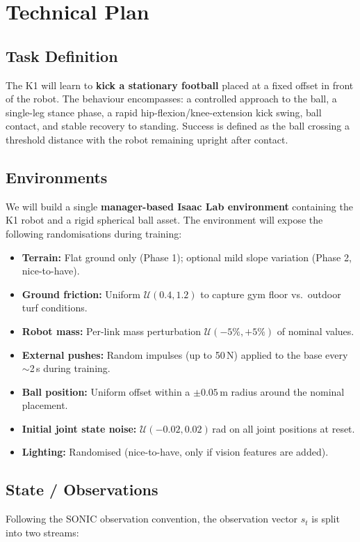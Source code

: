 \documentclass[12pt]{article}
\begin{document}
\section{Technical Plan}

\subsection{Task Definition}
The K1 will learn to \textbf{kick a stationary football} placed at a fixed offset in front of the robot. The behaviour encompasses: a controlled approach to the ball, a single-leg stance phase, a rapid hip-flexion/knee-extension kick swing, ball contact, and stable recovery to standing. Success is defined as the ball crossing a threshold distance with the robot remaining upright after contact.

\subsection{Environments}
We will build a single \textbf{manager-based Isaac Lab environment} containing the K1 robot and a rigid spherical ball asset. The environment will expose the following randomisations during training:

\begin{itemize}[noitemsep]
    \item \textbf{Terrain:} Flat ground only (Phase 1); optional mild slope variation (Phase 2, nice-to-have).
    \item \textbf{Ground friction:} Uniform $\mathcal{U}(0.4, 1.2)$ to capture gym floor vs.\ outdoor turf conditions.
    \item \textbf{Robot mass:} Per-link mass perturbation $\mathcal{U}(-5\%,+5\%)$ of nominal values.
    \item \textbf{External pushes:} Random impulses (up to 50\,N) applied to the base every $\sim$2\,s during training.
    \item \textbf{Ball position:} Uniform offset within a $\pm0.05$\,m radius around the nominal placement.
    \item \textbf{Initial joint state noise:} $\mathcal{U}(-0.02, 0.02)$\,rad on all joint positions at reset.
    \item \textbf{Lighting:} Randomised (nice-to-have, only if vision features are added).
\end{itemize}

\subsection{State / Observations}
Following the SONIC observation convention, the observation vector $s_t$ is split into two streams:
\end{document}
